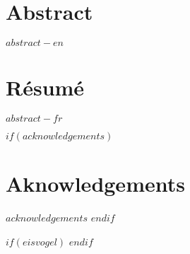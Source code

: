 



\cleardoublepage
\begin{minipage}{\linewidth}

\chapter*{Abstract}
$abstract-en$


\newpage
\chapter*{Résumé}
$abstract-fr$

\end{minipage}
\cleardoublepage



$if(acknowledgements)$
\chapter*{Aknowledgements}
$acknowledgements$
$endif$


\cleardoublepage

$if(eisvogel)$
\pagestyle{eisvogel-header-footer}
\lhead[\leftmark]{}
\rhead[]{\rightmark}
$endif$

